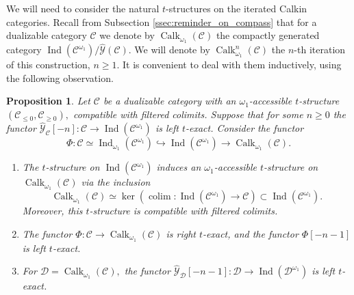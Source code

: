 \documentclass[11pt,leqno]{amsart}
\newtheorem{prop}[theo]{Proposition}
\numberwithin{equation}{section}
\DeclareMathOperator*{\colim}{colim}
\newcommand{\hto}{\hookrightarrow}
\newcommand{\cD}{{\mathcal D}}
\newcommand{\cC}{{\mathcal C}}
\newcommand{\cE}{{\mathcal E}}
\newcommand{\cY}{{\mathcal Y}}
\newcommand{\la}{\langle}
\newcommand{\ra}{\rangle}
\newcommand{\Ind}{\operatorname{Ind}}
\newcommand{\Calk}{\operatorname{Calk}}
\begin{document}


We will need to consider the natural $t$-structures on the iterated Calkin categories. Recall from Subsection \ref{ssec:reminder_on_compass} that for a dualizable category $\cC$ we denote by $\Calk_{\omega_1}(\cC)$ the compactly generated category $\Ind(\cC^{\omega_1})/\hat{\cY}(\cC).$ We will denote by $\Calk_{\omega_1}^n(\cC)$ the $n$-th iteration of this construction, $n\geq 1.$ It is convenient to deal with them inductively, using the following observation.

\begin{prop}\label{prop:t_structure_on_Calk_properties}
Let $\cC$ be a dualizable category with an $\omega_1$-accessible $t$-structure $(\cC_{\leq 0},\cC_{\geq 0}),$ compatible with filtered colimits. Suppose that for some $n\geq 0$ the functor $\hat{\cY}_{\cC}[-n]:\cC\to \Ind(\cC^{\omega_1})$ is left $t$-exact. Consider the functor 
\begin{equation*}
\Phi:\cC\simeq\Ind_{\omega_1}(\cC^{\omega_1})\hto\Ind(\cC^{\omega_1})\to\Calk_{\omega_1}(\cC).
\end{equation*}
\begin{enumerate}[label=(\roman*),ref=(\roman*)]
	\item The $t$-structure on $\Ind(\cC^{\omega_1})$ induces an $\omega_1$-accessible $t$-structure on $\Calk_{\omega_1}(\cC)$ via the inclusion
	\begin{equation*}
	\Calk_{\omega_1}(\cC)\simeq \ker(\colim:\Ind(\cC^{\omega_1})\to\cC)\subset\Ind(\cC^{\omega_1}).
	\end{equation*}
	Moreover, this $t$-structure is compatible with filtered colimits. \label{t_structure_on_Calk}
	\item The functor $\Phi:\cC\to \Calk_{\omega_1}(\cC)$ is right $t$-exact, and the functor $\Phi[-n-1]$ is left $t$-exact. \label{functor_to_Calk_amplitude}
	\item For $\cD=\Calk_{\omega_1}(\cC),$ the functor $\hat{\cY}_{\cD}[-n-1]:\cD\to\Ind(\cD^{\omega_1})$ is left $t$-exact. \label{amplitude_for_Calk_jumps} 
\end{enumerate}
\end{prop}
\end{document}
